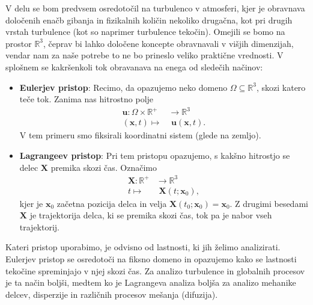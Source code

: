 \documentclass[mat2, tisk]{fmfdelo}
\newcommand{\R}{\mathbb R}
\newcommand{\bd}{\textbf}
\begin{document}
V delu se bom predvsem osredotočil na turbulenco v atmosferi, kjer je obravnava določenih enačb
gibanja in fizikalnih količin nekoliko drugačna, kot pri drugih vrstah turbulence (kot so naprimer turbulence tekočin).
Omejili se bomo na prostor $\R^3$, čeprav bi lahko določene koncepte 
obravnavali v višjih dimenzijah, vendar nam za naše potrebe to ne bo 
prineslo veliko praktične vrednosti.
V splošnem se kakršenkoli tok obravanava na enega od sledečih načinov:
\begin{itemize}
  \item \textbf{Eulerjev pristop}: Recimo, da opazujemo neko domeno $\Omega \subseteq \R^3$, skozi katero teče tok.
  Zanima nas hitrostno polje 
  \begin{align*}
  \textbf{u}: \Omega \times \R^+ &\rightarrow \R^3 \\
  (\bd{x},t) \mapsto&\,\, \textbf{u}(\bd{x},t).
  \end{align*}
  V tem primeru smo fiksirali koordinatni
  sistem (glede na zemljo).
  \item \textbf{Lagrangeev pristop}: Pri tem pristopu opazujemo, s kakšno hitrostjo se delec 
  $\bd{X}$ premika skozi čas. Označimo 
  \begin{align*}
    \bd{X}: \R^+& \rightarrow \R^3 \\
    t \mapsto&\,\, \bd{X}(t; \bd{x}_0),
  \end{align*}
  kjer je $\bd{x}_0$ začetna pozicija delca in 
  velja $\bd{X}(t_0; \bd{x}_0) = \bd{x}_0$.  
  Z drugimi besedami $\bd{X}$ je trajektorija delca, ki se premika skozi čas, tok pa je nabor vseh trajektorij.
\end{itemize}

Kateri pristop uporabimo, je odvisno od lastnosti, ki jih želimo analizirati. Eulerjev pristop
se osredotoči na fiksno domeno in opazujemo kako se lastnosti tekočine spreminjajo v njej skozi čas. 
Za analizo turbulence in globalnih procesov je ta način boljši, medtem ko je Lagrangeva analiza 
boljša za analizo mehanike delcev, disperzije in različnih procesov mešanja (difuzija). 
\end{document}
